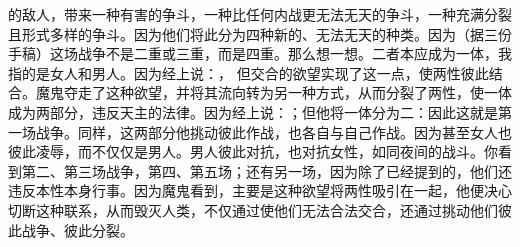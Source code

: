 的敌人，带来一种有害的争斗，一种比任何内战更无法无天的争斗，一种充满分裂且形式多样的争斗。因为他们将此分为四种新的、无法无天的种类。因为（据三份手稿）这场战争不是二重或三重，而是四重。那么想一想。二者本应成为一体，我指的是女人和男人。因为经上说：， 但交合的欲望实现了这一点，使两性彼此结合。魔鬼夺走了这种欲望，并将其流向转为另一种方式，从而分裂了两性，使一体成为两部分，违反天主的法律。因为经上说：；但他将一体分为二：因此这就是第一场战争。同样，这两部分他挑动彼此作战，也各自与自己作战。因为甚至女人也彼此凌辱，而不仅仅是男人。男人彼此对抗，也对抗女性，如同夜间的战斗。你看到第二、第三场战争，第四、第五场；还有另一场，因为除了已经提到的，他们还违反本性本身行事。因为魔鬼看到，主要是这种欲望将两性吸引在一起，他便决心切断这种联系，从而毁灭人类，不仅通过使他们无法合法交合，还通过挑动他们彼此战争、彼此分裂。\par

